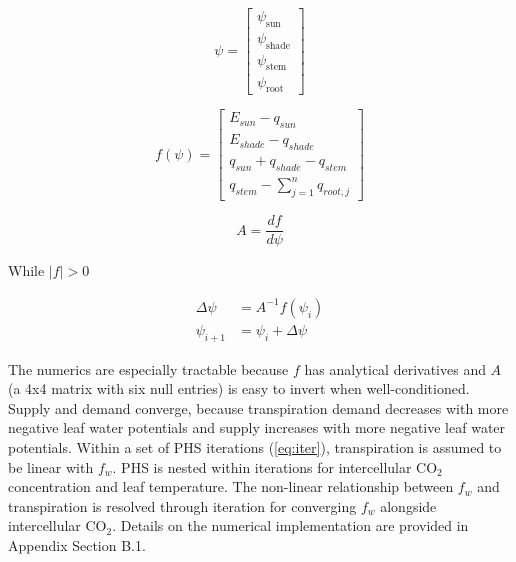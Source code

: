\documentclass[draft,linenumbers]{agujournal}
\begin{document}
    \begin{linenomath*}
    \begin{equation} 
    \psi = \left[
    \begin{array}{c}
    \psi_{\text{sun}} \\ 
    \psi_{\text{shade}} \\ 
    \psi_{\text{stem}} \\ 
    \psi_{\text{root}}            
    \end{array} \right]
    \end{equation}
    \end{linenomath*}
    
    \begin{linenomath*}
    \begin{equation}
    f\left(\psi\right) = \left[ 
    \begin{array}{c}
    E_{sun}-q_{sun}\\
    E_{shade}-q_{shade}\\
    q_{sun}+q_{shade}-q_{stem}\\
    q_{stem}-\sum_{j=1}^n{q_{root,j}}
    \end{array} \right]
    \end{equation}
    \end{linenomath*}
    
    \begin{linenomath*}
    \begin{equation}
    A = \dfrac{df}{d\psi}
    \end{equation}
    \end{linenomath*}    
    
    While $\left|f\right|>0$
    \begin{linenomath*}
    \begin{equation} \begin{aligned}
    \label{eq:iter}
    \Delta\psi &=A^{-1}f\left(\psi_i\right) \\
    \psi_{i+1}  &= \psi_i + \Delta\psi
    \end{aligned} \end{equation}
    \end{linenomath*}    
    
    The numerics are especially tractable because $f$ has analytical derivatives and $A$ 
    (a 4x4 matrix with six null entries) is easy to invert when well-conditioned. 
    Supply and demand converge, because transpiration demand decreases with more negative 
    leaf water potentials and supply increases with more negative leaf water potentials.
    Within a set of PHS iterations (\ref{eq:iter}), transpiration is assumed to be linear with $f_w$.
    PHS is nested within iterations for intercellular CO$_2$ concentration and leaf temperature.
    The non-linear relationship between $f_w$ and transpiration is resolved through iteration for converging $f_w$ alongside intercellular CO$_2$.
    Details on the numerical implementation are provided in Appendix Section B.1.
\end{document}
